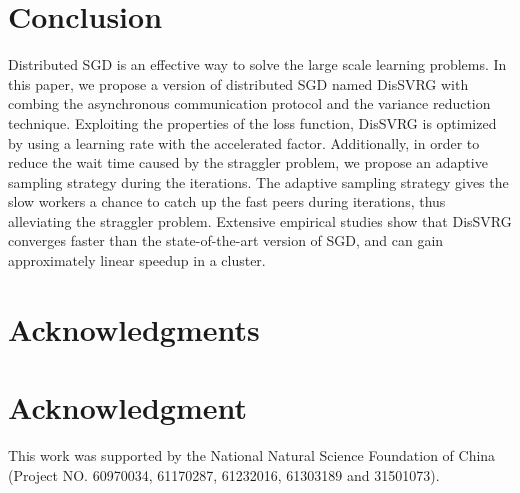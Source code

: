 \documentclass[10pt,journal,finalsubmission,compsoc]{IEEEtran}
\begin{document}
\section{Conclusion}
\label{conclusion}
Distributed SGD is an effective way to solve the large scale learning problems. In this paper, we propose a version of distributed SGD named DisSVRG with combing the asynchronous communication protocol and the variance reduction technique. Exploiting the properties of the loss function, DisSVRG is optimized by using a learning rate with the accelerated factor. Additionally,  in order to reduce the wait time caused by the straggler problem, we propose an adaptive sampling strategy during the iterations. The adaptive sampling strategy gives the slow workers a chance to catch up the fast peers during iterations, thus alleviating the straggler problem. Extensive empirical studies show that DisSVRG converges faster than the state-of-the-art version of SGD, and can gain approximately linear speedup in a cluster. 







\balance

\ifCLASSOPTIONcompsoc

  \section*{Acknowledgments}
\else

  \section*{Acknowledgment}
\fi
This work was  supported by the National Natural Science Foundation of China (Project NO. 60970034, 61170287, 61232016, 61303189 and 31501073).




\end{document}
